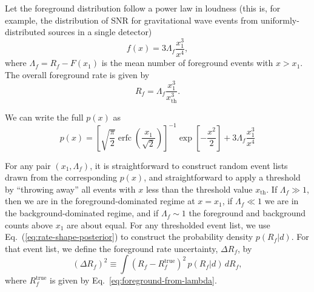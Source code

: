 \documentclass[aps,prd,reprint,nofootinbib]{revtex4-1}
\DeclareMathOperator{\erfc}{erfc}
\begin{document}
Let the foreground distribution follow a power law in loudness (this
is, for example, the distribution of SNR for gravitational wave events
from uniformly-distributed sources in a single detector)
\begin{equation}
\label{eq:ps}
f(x) = 3 \Lambda_f \frac{x_1^3}{x^4},
\end{equation}
where $\Lambda_f = R_f - F\left(x_1\right)$ is the mean number of
foreground events with $x > x_1$.  The overall foreground rate is
given by 
\begin{equation}
  \label{eq:foreground-from-lambda}
  R_f = \Lambda_f \frac{x_1^3}{x_\mathrm{th}^3}.
\end{equation}

We can write the full $p(x)$ as
\begin{equation}
\label{eq:ptot} 
p(x) = \left[\sqrt{\frac{\pi}{2}}
  \erfc\left(\frac{x_1}{\sqrt{2}}\right)\right]^{-1}\exp\left[-\frac{x^2}{2}\right]
+ 3 \Lambda_f \frac{x_1^3}{x^4}
\end{equation}

For any pair $(x_1, \Lambda_f)$, it is straightforward to construct
random event lists drawn from the corresponding $p(x)$, and
straightforward to apply a threshold by ``throwing away'' all events
with $x$ less than the threshold value $x_\mathrm{th}$.  If $\Lambda_f
\gg 1$, then we are in the foreground-dominated regime at $x = x_1$,
if $\Lambda_f \ll 1$ we are in the background-dominated regime, and if
$\Lambda_f \sim 1$ the foreground and background counts above $x_1$
are about equal.  For any thresholded event list, we use
Eq.~(\ref{eq:rate-shape-posterior}) to construct the probability
density $p(R_f|d)$.  For that event list, we define the foreground
rate uncertainty, $\Delta R_f$, by
\begin{equation}
\label{eq:delta-R-definition}
(\Delta R_f)^2 \equiv \int{(R_f - R_f^\mathrm{true})^2 \, p(R_f|d)\, dR_f },
\end{equation}
where $R_f^\mathrm{true}$ is given by
Eq.~\eqref{eq:foreground-from-lambda}.
\end{document}
